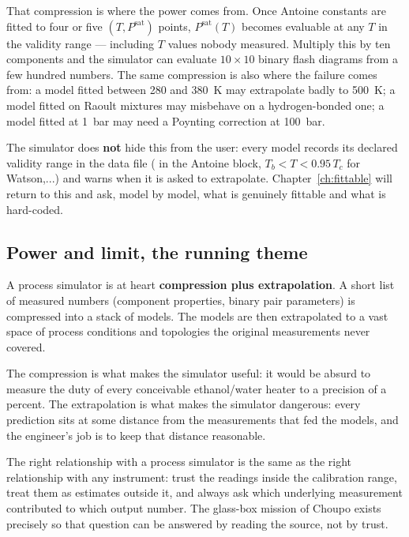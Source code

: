 \documentclass[11pt,a4paper]{article}
\begin{document}
That compression is where the power comes from.  Once Antoine
constants are fitted to four or five $(T, P^{\mathrm{sat}})$ points,
$P^{\mathrm{sat}}(T)$ becomes evaluable at any $T$ in the validity
range --- including $T$ values nobody measured.  Multiply this by
ten components and the simulator can evaluate $10 \times 10$ binary
flash diagrams from a few hundred numbers.  The same compression is
also where the failure comes from: a model fitted between 280 and
380~K may extrapolate badly to 500~K; a model fitted on Raoult
mixtures may misbehave on a hydrogen-bonded one; a model fitted at
1~bar may need a Poynting correction at 100~bar.

The simulator does \textbf{not} hide this from the user: every model
records its declared validity range in the data file (
in the Antoine block, $T_b < T < 0.95\,T_c$ for Watson,...) and
warns when it is asked to extrapolate.  Chapter~\ref{ch:fittable}
will return to this and ask, model by model, what is genuinely
fittable  and what is hard-coded.

\subsection{Power and limit, the running theme}

A process simulator is at heart \textbf{compression plus
extrapolation}.  A short list of measured numbers (component
properties, binary pair parameters) is compressed into a stack of
models.  The models are then extrapolated to a vast space of
process conditions and topologies the original measurements never
covered.

The compression is what makes the simulator useful: it would be
absurd to measure the duty of every conceivable ethanol/water heater
to a precision of a percent.  The extrapolation is what makes the
simulator dangerous: every prediction sits at some distance from
the measurements that fed the models, and the engineer's job is to
keep that distance reasonable.

\begin{intuition}
The right relationship with a process simulator is the same as the
right relationship with any instrument: trust the readings inside
the calibration range, treat them as estimates outside it, and
always ask which underlying measurement contributed to which output
number.  The glass-box mission of Choupo exists precisely so that
question can be answered by reading the source, not by trust.
\end{intuition}
\end{document}
